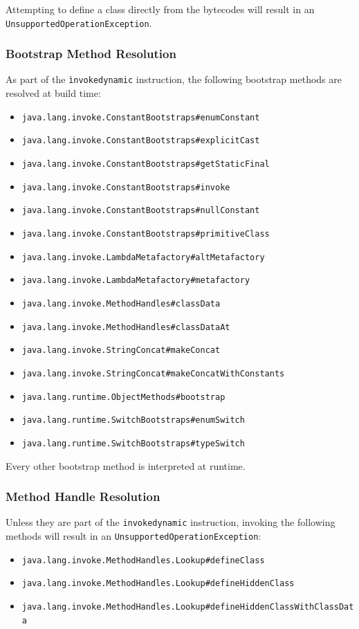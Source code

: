 Attempting to define a class directly from the bytecodes will result in an \texttt{UnsupportedOperationException}.

\subsubsection{Bootstrap Method Resolution}\label{bootstrap_method_resolution}
As part of the \texttt{ìnvokedynamic} instruction, the following bootstrap methods are resolved at build time:
\begin{itemize}
    \item \texttt{java.lang.invoke.ConstantBootstraps\#enumConstant} 
    \item \texttt{java.lang.invoke.ConstantBootstraps\#explicitCast} 
    \item \texttt{java.lang.invoke.ConstantBootstraps\#getStaticFinal} 
    \item \texttt{java.lang.invoke.ConstantBootstraps\#invoke} 
    \item \texttt{java.lang.invoke.ConstantBootstraps\#nullConstant} 
    \item \texttt{java.lang.invoke.ConstantBootstraps\#primitiveClass} 
    \item \texttt{java.lang.invoke.LambdaMetafactory\#altMetafactory} 
    \item \texttt{java.lang.invoke.LambdaMetafactory\#metafactory} 
    \item \texttt{java.lang.invoke.MethodHandles\#classData} 
    \item \texttt{java.lang.invoke.MethodHandles\#classDataAt} 
    \item \texttt{java.lang.invoke.StringConcat\#makeConcat} 
    \item \texttt{java.lang.invoke.StringConcat\#makeConcatWithConstants} 
    \item \texttt{java.lang.runtime.ObjectMethods\#bootstrap} 
    \item \texttt{java.lang.runtime.SwitchBootstraps\#enumSwitch}
    \item \texttt{java.lang.runtime.SwitchBootstraps\#typeSwitch} 
\end{itemize}
Every other bootstrap method is interpreted at runtime.

\subsubsection{Method Handle Resolution}
Unless they are part of the \texttt{invokedynamic} instruction, invoking the following methods will result in an \texttt{UnsupportedOperationException}:
\begin{itemize}
    \item \texttt{java.lang.invoke.MethodHandles.Lookup\#defineClass} 
    \item \texttt{java.lang.invoke.MethodHandles.Lookup\#defineHiddenClass} 
    \item \texttt{java.lang.invoke.MethodHandles.Lookup\#defineHiddenClassWithClassData}
\end{itemize}

